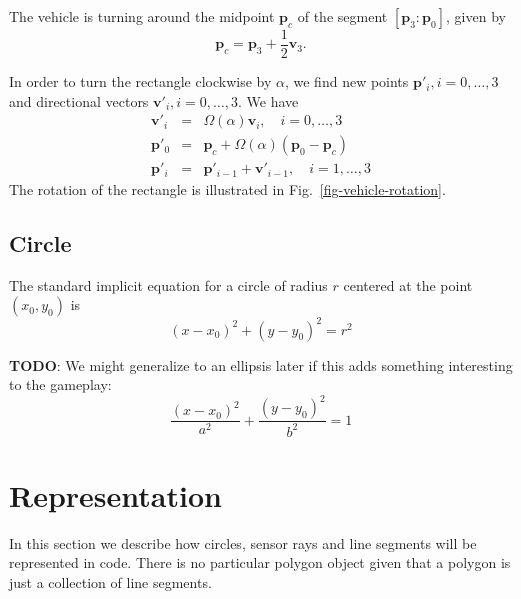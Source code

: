 \documentclass[11pt]{article}
\newcommand{\pb}{\mathbf{p}}
\newcommand{\vb}{\mathbf{v}}
\newcommand{\figref}[1]{Fig.~\eqref{#1}}
\newcommand{\TODO}{{\bf TODO}}
\begin{document}
The vehicle is turning around the midpoint $\pb_c$ of the segment
$[\pb_3:\pb_0]$, given by
\begin{equation*}
    \pb_c = \pb_3 + \frac{1}{2}\vb_3.
\end{equation*}

In order to turn the rectangle clockwise by $\alpha$, we find new points
$\pb'_i,i=0,\ldots,3$ and directional vectors $\vb'_i,i=0,\ldots,3$.
We have
\begin{eqnarray}
    \vb'_i &=& \Omega(\alpha)\vb_i,\quad i=0,\ldots,3 \\
    \pb'_0 &=& \pb_c + \Omega(\alpha)(\pb_0 - \pb_c) \\
    \pb'_i &=& \pb'_{i-1} + \vb'_{i-1},\quad i=1,\ldots,3
\end{eqnarray}
The rotation of the rectangle is illustrated in \figref{fig-vehicle-rotation}.

\subsection{Circle}
\label{sec-circle}

The standard implicit equation for a circle of radius $r$  centered at the
point $(x_0, y_0)$ is
\begin{equation}
    (x - x_0)^2 + (y - y_0)^2 = r^2\label{eq-circle}
\end{equation}

\TODO: We might generalize to an ellipsis later if this adds something
interesting to the gameplay:
\begin{equation}
    \frac{(x-x_0)^2}{a^2} + \frac{(y-y_0)^2}{b^2} = 1
\end{equation}

\section{Representation}
\label{sec-representation}
In this section we describe how circles, sensor rays and line segments will be
represented in code. There is no particular polygon object given that a
polygon is just a collection of line segments.
\end{document}
